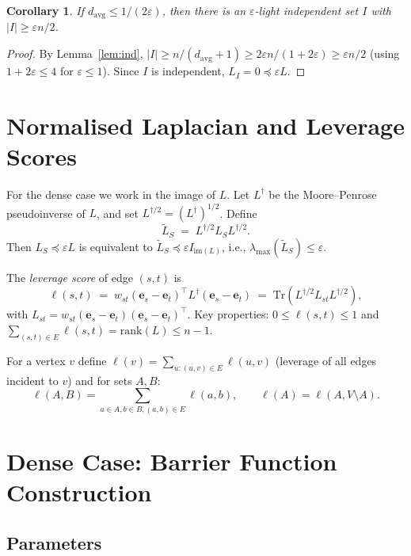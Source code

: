 \documentclass[12pt]{article}
\newtheorem{corollary}[theorem]{Corollary}
\theoremstyle{definition}
\theoremstyle{remark}
\begin{document}
\begin{corollary}\label{cor:sparse}
If $d_{\mathrm{avg}}\le1/(2\varepsilon)$, then there is an $\varepsilon$-light
independent set $I$ with $|I|\ge\varepsilon n/2$.
\end{corollary}

\begin{proof}
By Lemma~\ref{lem:ind}, $|I|\ge n/(d_{\mathrm{avg}}+1)\ge
2\varepsilon n/(1+2\varepsilon)\ge\varepsilon n/2$
(using $1+2\varepsilon\le4$ for $\varepsilon\le1$).
Since $I$ is independent, $L_I=0\preceq\varepsilon L$.
\end{proof}

\section{Normalised Laplacian and Leverage Scores}

For the dense case we work in the image of $L$.  Let $L^\dagger$ be the
Moore--Penrose pseudoinverse of $L$, and set
$L^{\dagger/2}=(L^\dagger)^{1/2}$.  Define
\[
  \widetilde{L}_S \;=\; L^{\dagger/2}L_S L^{\dagger/2}.
\]
Then $L_S\preceq\varepsilon L$ is equivalent to
$\widetilde{L}_S\preceq\varepsilon I_{\mathrm{im}(L)}$, i.e.,
$\lambda_{\max}(\widetilde{L}_S)\le\varepsilon$.

\noindent The \emph{leverage score} of edge $(s,t)$ is
\[
  \ell(s,t) \;=\; w_{st}(\mathbf{e}_s-\mathbf{e}_t)^\top
               L^\dagger(\mathbf{e}_s-\mathbf{e}_t)
            \;=\; \mathrm{Tr}\!\left(L^{\dagger/2}L_{st}L^{\dagger/2}\right),
\]
with $L_{st}=w_{st}(\mathbf{e}_s-\mathbf{e}_t)(\mathbf{e}_s-\mathbf{e}_t)^\top$.
Key properties: $0\le\ell(s,t)\le1$ and
$\sum_{(s,t)\in E}\ell(s,t)=\mathrm{rank}(L)\le n-1$.

\noindent For a vertex $v$ define $\ell(v)=\sum_{u:(u,v)\in E}\ell(u,v)$
(leverage of all edges incident to $v$) and for sets $A,B$:
\[
  \ell(A,B)=\sum_{a\in A,b\in B,(a,b)\in E}\ell(a,b),\qquad
  \ell(A)=\ell(A,V\setminus A).
\]

\section{Dense Case: Barrier Function Construction}

\subsection{Parameters}
\end{document}
